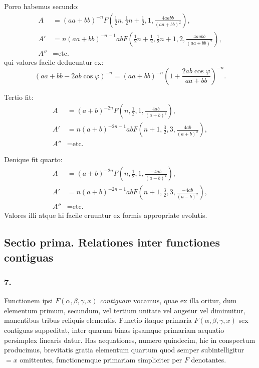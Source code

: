 \documentclass[12pt,a4paper]{article}
\newcommand{\1}{\ensuremath{\mathrlap{\,|\,}}} %
\begin{document}
Porro habemus secundo:
\begin{align*}
A &= (aa+bb)^{-n}F(\tfrac{1}{2}n, \tfrac{1}{2}n+\tfrac{1}{2}, 1, \tfrac{4aabb}{(aa+bb)^2}),\\
A' &= n(aa+bb)^{-n-1}abF(\tfrac{1}{2}n+\tfrac{1}{2}, \tfrac{1}{2}n+1, 2, \tfrac{4aabb}{(aa+bb)^2}),\\
A'' &= \text{etc.}
\end{align*}
qui valores facile deducuntur ex:
\[(aa+bb-2ab\cos\varphi)^{-n} = (aa+bb)^{-n}\left(1 + \frac{2ab\cos\varphi}{aa+bb}\right)^{-n}.\]

Tertio fit:
\begin{align*}
A &= (a+b)^{-2n}F(n, \tfrac{1}{2}, 1, \tfrac{4ab}{(a+b)^2}),\\
A' &= n(a+b)^{-2n-1}abF(n+1, \tfrac{3}{2}, 3, \tfrac{4ab}{(a+b)^2}),\\
A'' &= \text{etc.}
\end{align*}

Denique fit quarto:
\begin{align*}
A &= (a+b)^{-2n}F(n, \tfrac{1}{2}, 1, \tfrac{-4ab}{(a-b)^2}),\\
A' &= n(a+b)^{-2n-1}abF(n+1, \tfrac{3}{2}, 3, \tfrac{-4ab}{(a-b)^2}),\\
A'' &= \text{etc.}
\end{align*}
Valores illi atque hi facile eruuntur ex formis appropriate evolutis.

\newpage
\subsection*{Sectio prima. Relationes inter functiones contiguas}

\subsubsection*{7.}

Functionem ipsi $F(\alpha, \beta, \gamma, x)$ \textit{contiguam} vocamus, quae ex illa oritur, dum elementum primum, secundum, vel tertium unitate vel augetur vel diminuitur, manentibus tribus reliquis elementis. Functio itaque primaria $F(\alpha, \beta, \gamma, x)$ sex contiguas suppeditat, inter quarum binas ipsamque primariam aequatio persimplex linearis datur. Has aequationes, numero quindecim, hic in conspectum producimus, brevitatis gratia elementum quartum quod semper subintelligitur $= x$ omittentes, functionemque primariam simpliciter per $F$ denotantes.
\end{document}
